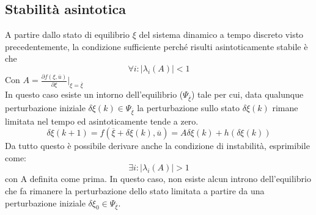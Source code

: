 \subsection{Stabilità asintotica}\label{Appendice:stabilita}
A partire dallo stato di equilibrio $\xi$ del sistema dinamico a tempo discreto visto precedentemente, la condizione sufficiente perché risulti asintoticamente stabile è che 
\begin{equation}
\forall i : |\lambda_i(A)| < 1
\end{equation}
Con $A = \frac{\partial f(\xi,\overline{u})}{\partial \xi}\bigg|_{\xi = \overline{\xi}}$
\\In questo caso esiste un intorno dell'equilibrio ($\Psi_{\overline{\xi}}$) tale per cui, data qualunque perturbazione iniziale $\delta \xi (k) \in \Psi_{\overline{\xi}}$ la perturbazione sullo stato $\delta \xi (k)$ rimane limitata nel tempo ed asintoticamente tende a zero. 
\begin{equation}
\delta \xi (k+1) = f(\overline{\xi}+\delta \xi (k),\overline{u}) = A\delta\xi(k)+h(\delta\xi(k))
\end{equation}
Da tutto questo è possibile derivare anche la condizione di instabilità, esprimibile come:
\begin{equation}
\exists i : |\lambda_i(A)|>1
\end{equation}
con A definita come prima. In questo caso, non esiste alcun introno dell'equilibrio che fa rimanere la perturbazione dello stato limitata a partire da una perturbazione iniziale $\delta \xi_0 \in \Psi_{\overline{\xi}}$. 
